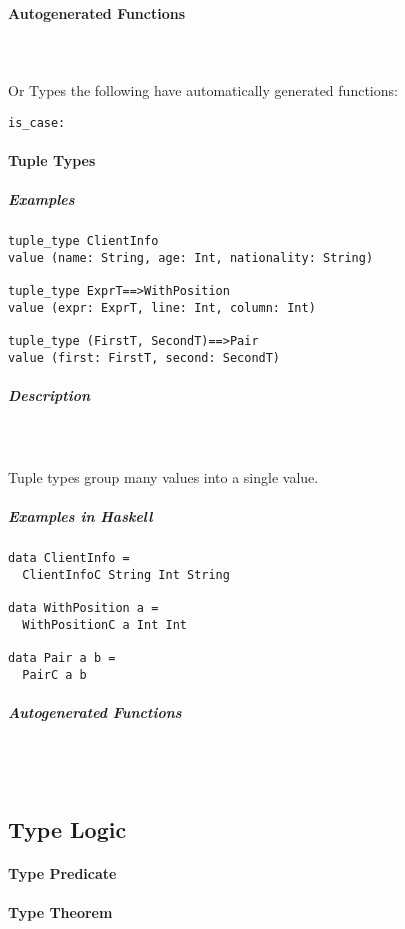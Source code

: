 \documentclass{article}
\def\H{Haskell}
\begin{document}
\paragraph{Autogenerated Functions}\mbox{} \\\\
Or Types the following have automatically generated functions:

\begin{verbatim}
is_case:
\end{verbatim}

\paragraph{Tuple Types}

\subparagraph{Examples}

\begin{verbatim}
tuple_type ClientInfo
value (name: String, age: Int, nationality: String)

tuple_type ExprT==>WithPosition
value (expr: ExprT, line: Int, column: Int)

tuple_type (FirstT, SecondT)==>Pair
value (first: FirstT, second: SecondT)
\end{verbatim}

\subparagraph{Description}\mbox{} \\\\
Tuple types group many values into a single value.

\subparagraph{Examples in \H}

\begin{verbatim}
data ClientInfo =
  ClientInfoC String Int String

data WithPosition a = 
  WithPositionC a Int Int

data Pair a b = 
  PairC a b
\end{verbatim}

\subparagraph{Autogenerated Functions}\mbox{} \\\\

\subsection{Type Logic}

\paragraph{Type Predicate}

\paragraph{Type Theorem}
\end{document}
